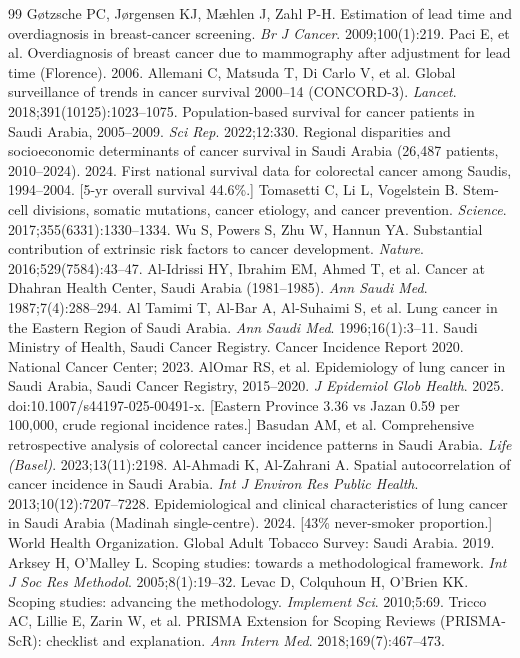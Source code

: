 \documentclass[3p,times]{elsarticle}
\begin{document}
\begin{thebibliography}{99}
 G\o tzsche PC, J\o rgensen KJ, M\ae hlen J, Zahl P-H. Estimation of lead time and overdiagnosis in breast-cancer screening. \textit{Br J Cancer}. 2009;100(1):219.
 Paci E, et al. Overdiagnosis of breast cancer due to mammography after adjustment for lead time (Florence). 2006.
 Allemani C, Matsuda T, Di Carlo V, et al. Global surveillance of trends in cancer survival 2000--14 (CONCORD-3). \textit{Lancet}. 2018;391(10125):1023--1075.
 Population-based survival for cancer patients in Saudi Arabia, 2005--2009. \textit{Sci Rep}. 2022;12:330.
 Regional disparities and socioeconomic determinants of cancer survival in Saudi Arabia (26,487 patients, 2010--2024). 2024.
 First national survival data for colorectal cancer among Saudis, 1994--2004. [5-yr overall survival 44.6\%.]
 Tomasetti C, Li L, Vogelstein B. Stem-cell divisions, somatic mutations, cancer etiology, and cancer prevention. \textit{Science}. 2017;355(6331):1330--1334.
 Wu S, Powers S, Zhu W, Hannun YA. Substantial contribution of extrinsic risk factors to cancer development. \textit{Nature}. 2016;529(7584):43--47.
 Al-Idrissi HY, Ibrahim EM, Ahmed T, et al. Cancer at Dhahran Health Center, Saudi Arabia (1981--1985). \textit{Ann Saudi Med}. 1987;7(4):288--294.
 Al Tamimi T, Al-Bar A, Al-Suhaimi S, et al. Lung cancer in the Eastern Region of Saudi Arabia. \textit{Ann Saudi Med}. 1996;16(1):3--11.
 Saudi Ministry of Health, Saudi Cancer Registry. Cancer Incidence Report 2020. National Cancer Center; 2023.
 AlOmar RS, et al. Epidemiology of lung cancer in Saudi Arabia, Saudi Cancer Registry, 2015--2020. \textit{J Epidemiol Glob Health}. 2025. doi:10.1007/s44197-025-00491-x. [Eastern Province 3.36 vs Jazan 0.59 per 100,000, crude regional incidence rates.]
 Basudan AM, et al. Comprehensive retrospective analysis of colorectal cancer incidence patterns in Saudi Arabia. \textit{Life (Basel)}. 2023;13(11):2198.
 Al-Ahmadi K, Al-Zahrani A. Spatial autocorrelation of cancer incidence in Saudi Arabia. \textit{Int J Environ Res Public Health}. 2013;10(12):7207--7228.
 Epidemiological and clinical characteristics of lung cancer in Saudi Arabia (Madinah single-centre). 2024. [43\% never-smoker proportion.]
 World Health Organization. Global Adult Tobacco Survey: Saudi Arabia. 2019.
 Arksey H, O'Malley L. Scoping studies: towards a methodological framework. \textit{Int J Soc Res Methodol}. 2005;8(1):19--32.
 Levac D, Colquhoun H, O'Brien KK. Scoping studies: advancing the methodology. \textit{Implement Sci}. 2010;5:69.
 Tricco AC, Lillie E, Zarin W, et al. PRISMA Extension for Scoping Reviews (PRISMA-ScR): checklist and explanation. \textit{Ann Intern Med}. 2018;169(7):467--473.

\end{thebibliography}

\end{document}
